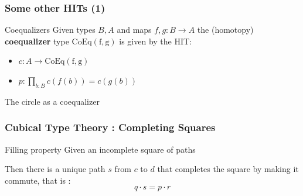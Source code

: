 \documentclass{beamer}
\begin{document}
    \begin{frame}[fragile]
        \frametitle{Some other HITs (1)}
        \begin{alertblock}{Coequalizers}
            Given types $B,A$ and maps $f,g : B \rightarrow  A$ the (homotopy) \textbf{coequalizer} type $\mathrm{CoEq(f,g)}$ is given by the HIT:\\
            \begin{minipage}{.45\textwidth} 
                \begin{itemize}
                \item $c : A \rightarrow \mathrm{CoEq(f,g)}$
                \item $p : \prod_{b : B} c(f(b))=c(g(b))$
                \end{itemize}
            \end{minipage}
            \hfill 
            \begin{minipage}{.45\textwidth} 
                \begin{center}
                \end{center}
            \end{minipage}
        \end{alertblock}
        \pause
        \begin{exampleblock}{The circle as a coequalizer}
            \begin{center}
            \end{center}
        \end{exampleblock}
    \end{frame}
    \begin{frame}[fragile]
        \frametitle{Cubical Type Theory : Completing Squares}
        \begin{alertblock}{Filling property}
            Given an incomplete square of paths 
            \begin{center}
            \end{center}
            Then there is a unique path $s$ from $c$ to $d$ that completes the square by making it commute, that is :
            $$ q \cdot s = p \cdot r $$
        \end{alertblock}

    \end{frame}
\end{document}
